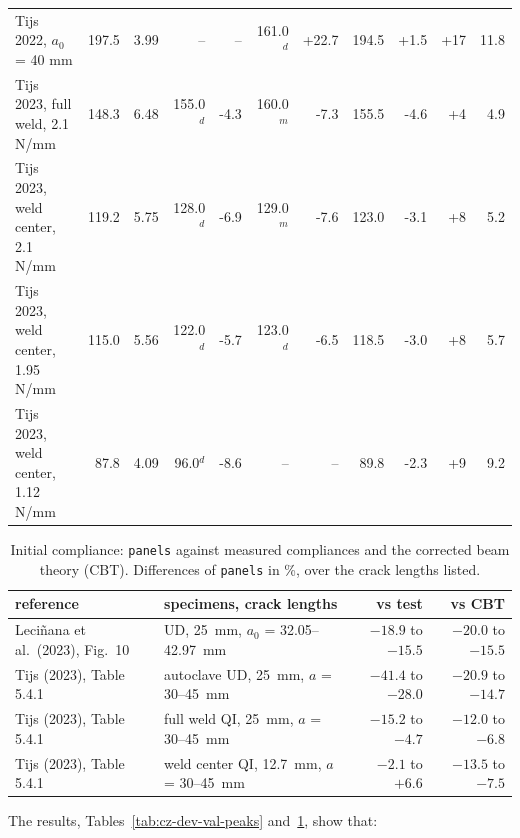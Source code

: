 \begin{table}[htb]
\begin{tabular}{lrrrrrrrrrr}
		Tijs 2022, $a_0$ = 40 mm & 197.5 & 3.99 & -- & -- & 161.0$^{d}$ & +22.7 & 194.5 & +1.5 & +17 & 11.8 \\
		Tijs 2023, full weld, 2.1 N/mm & 148.3 & 6.48 & 155.0$^{d}$ & -4.3 & 160.0$^{m}$ & -7.3 & 155.5 & -4.6 & +4 & 4.9 \\
		Tijs 2023, weld center, 2.1 N/mm & 119.2 & 5.75 & 128.0$^{d}$ & -6.9 & 129.0$^{m}$ & -7.6 & 123.0 & -3.1 & +8 & 5.2 \\
		Tijs 2023, weld center, 1.95 N/mm & 115.0 & 5.56 & 122.0$^{d}$ & -5.7 & 123.0$^{d}$ & -6.5 & 118.5 & -3.0 & +8 & 5.7 \\
		Tijs 2023, weld center, 1.12 N/mm & 87.8 & 4.09 & 96.0$^{d}$ & -8.6 & -- & -- & 89.8 & -2.3 & +9 & 9.2 \\
		\bottomrule
	\end{tabular}
\end{table}

\begin{table}[htb]
	\centering
	\caption{Initial compliance: \texttt{panels} against measured compliances and the corrected beam theory (CBT). Differences of \texttt{panels} in \%, over the crack lengths listed.}
	\label{tab:cz-dev-val-compliance}
	\small
	\begin{tabular}{llrr}
		\toprule
		reference & specimens, crack lengths & vs test & vs CBT \\
		\midrule
		Leci\~nana et al.\ (2023), Fig.~10 & UD, 25~mm, $a_0$ = 32.05--42.97~mm & $-18.9$ to $-15.5$ & $-20.0$ to $-15.5$ \\
		Tijs (2023), Table 5.4.1 & autoclave UD, 25~mm, $a$ = 30--45~mm & $-41.4$ to $-28.0$ & $-20.9$ to $-14.7$ \\
		Tijs (2023), Table 5.4.1 & full weld QI, 25~mm, $a$ = 30--45~mm & $-15.2$ to $-4.7$ & $-12.0$ to $-6.8$ \\
		Tijs (2023), Table 5.4.1 & weld center QI, 12.7~mm, $a$ = 30--45~mm & $-2.1$ to $+6.6$ & $-13.5$ to $-7.5$ \\
		\bottomrule
	\end{tabular}
\end{table}

The results, Tables~\ref{tab:cz-dev-val-peaks} and~\ref{tab:cz-dev-val-compliance}, show that:

